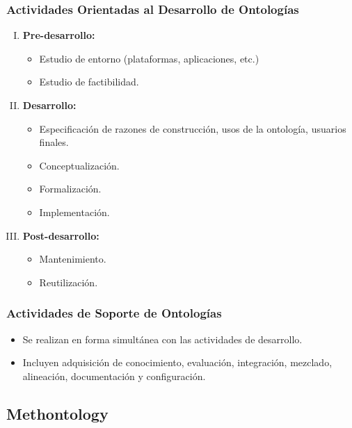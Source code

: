 \documentclass[a4paper,10pt,spanish,oneside]{article}
\begin{document}
\subsubsection{Actividades Orientadas al Desarrollo de Ontologías} 

\begin{enumerate}[I.]

\item \textbf{Pre-desarrollo:}

	\begin{itemize}
	\item Estudio de entorno (plataformas, aplicaciones, etc.)
	\item Estudio de factibilidad.
	\end{itemize}

\item \textbf{Desarrollo:}

	\begin{itemize}
	\item Especificación de razones de construcción, usos de la ontología, usuarios 		finales.
	\item Conceptualización.
	\item Formalización.
	\item Implementación.
	\end{itemize}

\item \textbf{Post-desarrollo:}

	\begin{itemize}
	\item Mantenimiento.
	\item Reutilización.
	\end{itemize}

\end{enumerate}

\subsubsection{Actividades de Soporte de Ontologías} 

\begin{itemize}
\item Se realizan en forma simultánea con las actividades de desarrollo.
\item Incluyen adquisición de conocimiento, evaluación, integración, mezclado, alineación, documentación y configuración.
\end{itemize}

\subsection{Methontology}
\end{document}
